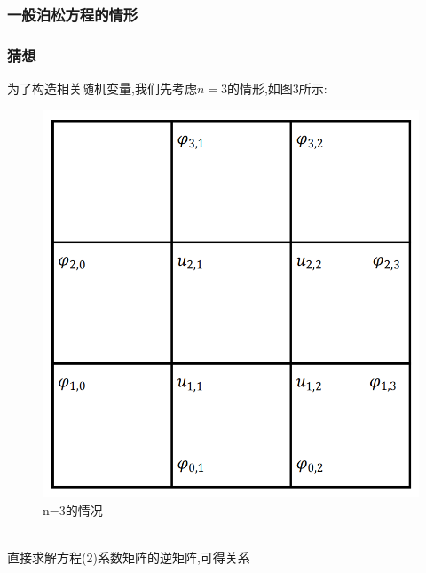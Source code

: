 \documentclass[UTF8,a4paper,notitlepage]{ctexart}%
\theoremstyle{nonumberplain}
\begin{document}
\subsubsection{一般泊松方程的情形}
\subsubsection*{猜想}
为了构造相关随机变量,我们先考虑$n=3$的情形,如图3所示:
\begin{figure}[ht]%
    \centering
    \includegraphics[scale=0.3]{tp3.png}
\caption{n=3的情况}\label{fig:tp3}
\end{figure}\\
直接求解方程(2)系数矩阵的逆矩阵,可得关系
\end{document}
